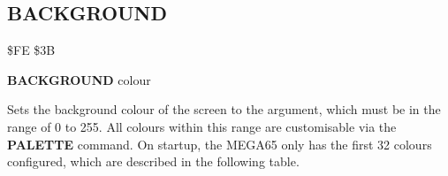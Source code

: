 \subsection{BACKGROUND}
\begin{description}[leftmargin=2cm,style=nextline]
\item [Token:] \$FE \$3B
\item [Format:] {\bf BACKGROUND} colour
\item [Usage:] Sets the background colour
               of the screen to the argument, which must be in the
               range of 0 to 255. All colours within this range are
               customisable via the {\bf PALETTE} command. On
               startup, the MEGA65 only has the first 32 colours configured,
               which are described in the following table.


\end{description}
